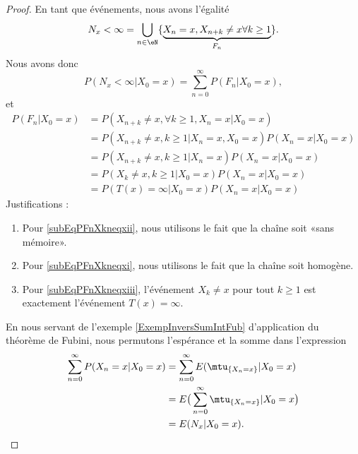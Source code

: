 \begin{proof}
    En tant que événements, nous avons l'égalité
    \begin{equation}
        N_x<\infty=\bigcup_{n\in\eN}\{\underbrace{ X_n=x,X_{n+k}\neq x\forall k\geq 1}_{F_n} \}.
    \end{equation}
    Nous avons donc 
    \begin{equation}    \label{Eqreprencalculstd}
        P(N_x<\infty|X_0=x)=\sum_{n=0}^{\infty}P(F_n|X_0=x),
    \end{equation}
    et
    \begin{subequations}
        \begin{align}
            P(F_n|X_0=x)&=P(X_{n+k}\neq x, \forall k\geq 1,X_n=x|X_0=x)\\
            &=P(X_{n+k}\neq x,k\geq 1|X_n=x,X_0=x)P(X_n=x|X_0=x)\\
            &=P(X_{n+k}\neq x,k\geq 1|X_n=x)P(X_n=x|X_0=x)  \label{subEqPFnXkneqxii}\\
            &=P(X_k\neq x,k\geq 1|X_0=x)P(X_n=x|X_0=x)  \label{subEqPFnXkneqxi}\\
            &=P(T(x)=\infty|X_0=x)P(X_n=x|X_0=x)    \label{subEqPFnXkneqxiii}
        \end{align}
    \end{subequations}
    Justifications :
    \begin{enumerate}
        \item
            Pour \eqref{subEqPFnXkneqxii}, nous utilisons le fait que la chaîne soit «sans mémoire».
        \item
            Pour \eqref{subEqPFnXkneqxi}, nous utilisons le fait que la chaîne soit homogène.
        \item
            Pour \eqref{subEqPFnXkneqxiii}, l'événement \( X_k\neq x\) pour tout \( k\geq 1\) est exactement l'événement \( T(x)=\infty\).
    \end{enumerate}
    En nous servant de l'exemple \ref{ExempInversSumIntFub} d'application du théorème de Fubini, nous permutons l'espérance et la somme dans l'expression
    \begin{subequations}        \label{EqPEEEntstq}
        \begin{align}
            \sum_{n=0}^{\infty}P(X_n=x|X_0=x)&=\sum_{n=0}^{\infty}E(\mtu_{\{ X_n=x \}}|X_0=x)\\
            &=E\big( \sum_{n=0}^{\infty}\mtu_{\{ X_n=x \}}|X_0=x \big)\\
            &=E(N_x|X_0=x).
        \end{align}

\end{subequations}
\end{proof}
